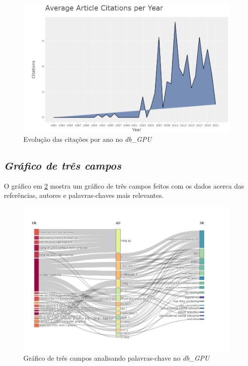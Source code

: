 \begin{figure}[ht]
    \centering
    \includegraphics[width=12cm]{experiments/gustavo-tomas/AnaliseBibliometrica/GPUs/Graficos/gpu-citation-year.png}
    \caption{Evolução das citações por ano no \textit{db\_GPU}}
    \label{fig:gpu-citation-year}
\end{figure}

\subsection{\textit{Gráfico de três campos}}

O gráfico em \ref{fig:gpu-three-field} mostra um gráfico de três campos feitos com os dados acerca das referências, autores e palavras-chaves mais relevantes.

\begin{figure}[ht]
    \centering
    \includegraphics[width=12cm]{experiments/gustavo-tomas/AnaliseBibliometrica/GPUs/Graficos/gpu-three-field.png}
    \caption{Gráfico de três campos analisando palavras-chave no \textit{db\_GPU}}
    \label{fig:gpu-three-field}
\end{figure}

